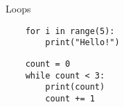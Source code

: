 \begin{frame}[fragile]{Loops}
    \begin{lstlisting}
    for i in range(5):
        print("Hello!")
    \end{lstlisting}
  
    \begin{lstlisting}
    count = 0
    while count < 3:
        print(count)
        count += 1
    \end{lstlisting}
  \end{frame}